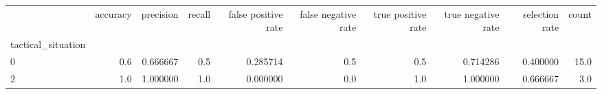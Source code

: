 \begin{tabular}{lrrrrrrrrr}
\toprule
{} &  accuracy &  precision &  recall &  false positive rate &  false negative rate &  true positive rate &  true negative rate &  selection rate &  count \\
tactical\_situation &           &            &         &                      &                      &                     &                     &                 &        \\
\midrule
0                  &       0.6 &   0.666667 &     0.5 &             0.285714 &                  0.5 &                 0.5 &            0.714286 &        0.400000 &   15.0 \\
2                  &       1.0 &   1.000000 &     1.0 &             0.000000 &                  0.0 &                 1.0 &            1.000000 &        0.666667 &    3.0 \\
\bottomrule
\end{tabular}
